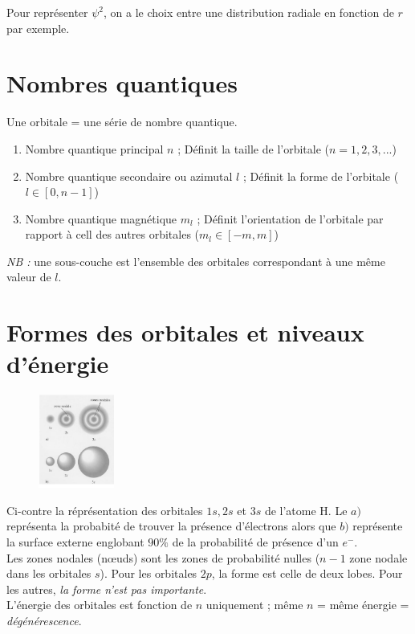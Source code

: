 \documentclass	[11pt, a4paper, openany]{book}
\begin{document}
Pour représenter $\psi^2$, on a le choix entre une distribution radiale en fonction de $r$ par exemple.

\section{Nombres quantiques}
Une orbitale = une série de nombre quantique.
\begin{enumerate}
	\item Nombre quantique principal $n$ ; Définit la taille de l'orbitale ($n = 1, 2, 3, ...$)
	\item Nombre quantique secondaire ou azimutal $l$ ; Définit la forme de l'orbitale ($l \in [0, n-1]$)
	\item Nombre quantique magnétique $m_l$ ; Définit l'orientation de l'orbitale par rapport à cell des autres orbitales ($m_l \in [-m, m]$)
\end{enumerate}
\textit{NB  :} une sous-couche est l'ensemble des orbitales correspondant à une même valeur de $l$.

\section{Formes des orbitales et niveaux d'énergie}
\begin{figure}
	\includegraphics[width=2.5cm]{image5.png}
\end{figure}
Ci-contre la réprésentation des orbitales $1s, 2s$ et $3s$ de l'atome H. Le $a)$ représenta la probabité de trouver la présence d'électrons alors que $b)$ représente la surface externe englobant $90\%$ de la probabilité de présence d'un $e^-$.\\
Les zones nodales (nœuds) sont les zones de probabilité nulles ($n-1$ zone nodale dans les orbitales $s$).
Pour les orbitales $2p$, la forme est celle de deux lobes. Pour les autres, \textit{la forme n'est pas importante}.\\
L'énergie des orbitales est fonction de $n$ uniquement ; même $n$ = même énergie = \textit{dégénérescence}.
\end{document}
